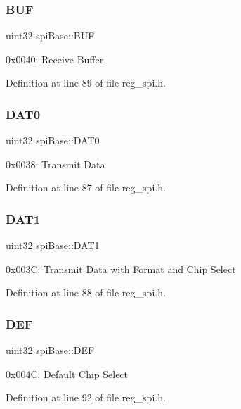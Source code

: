 \subsubsection{\texorpdfstring{B\+UF}{BUF}}
{\footnotesize\ttfamily uint32 spi\+Base\+::\+B\+UF}

0x0040\+: Receive Buffer 

Definition at line 89 of file reg\+\_\+spi.\+h.

\mbox{\label{structspiBase_a8d6cc63bd61c04754a926192a900778e}} 
\subsubsection{\texorpdfstring{D\+A\+T0}{DAT0}}
{\footnotesize\ttfamily uint32 spi\+Base\+::\+D\+A\+T0}

0x0038\+: Transmit Data 

Definition at line 87 of file reg\+\_\+spi.\+h.

\mbox{\label{structspiBase_a85553fb9cc61392ddf17f76e397c2fe2}} 
\subsubsection{\texorpdfstring{D\+A\+T1}{DAT1}}
{\footnotesize\ttfamily uint32 spi\+Base\+::\+D\+A\+T1}

0x003C\+: Transmit Data with Format and Chip Select 

Definition at line 88 of file reg\+\_\+spi.\+h.

\mbox{\label{structspiBase_accec72a826230c3a1834d6daaee8443d}} 
\subsubsection{\texorpdfstring{D\+EF}{DEF}}
{\footnotesize\ttfamily uint32 spi\+Base\+::\+D\+EF}

0x004C\+: Default Chip Select 

Definition at line 92 of file reg\+\_\+spi.\+h.

\mbox{\label{structspiBase_a89ec02b1cb15ce6a68133c7dab13df6d}} 
